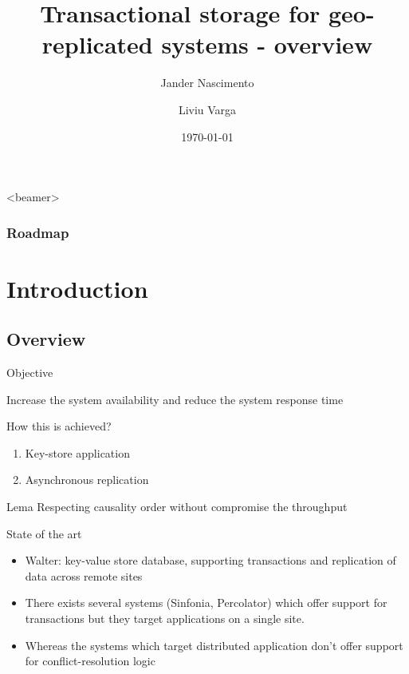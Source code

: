\documentclass{beamer}
\title[Transactional storage for geo-replicated systems ]{Transactional storage for geo-replicated systems - overview}
\author{Jander Nascimento
\and Liviu Varga}
\institute{Université Joseph Fourier}
\date{\today}
\begin{document}
\begin{frame}
\titlepage
\end{frame}

{
  \begin{frame}<beamer>
    \frametitle{Roadmap}
    \tableofcontents%
  \end{frame}
}


\section{Introduction}

	\subsection{Overview}
	
		\begin{frame}{Objective}
		
			Increase the system availability and reduce the system response time 
		
			How this is achieved?
			\begin{enumerate}
			\item Key-store application
			\item Asynchronous replication
			\end{enumerate}
			
			\begin{block}{Lema}
				Respecting causality order without compromise the throughput
			\end{block}		
		
		\end{frame}	
	
		\begin{frame}{State of the art}
		
		\begin{itemize}
		\item Walter: key-value store database, supporting transactions and replication of data across remote sites
		\item There exists several systems (Sinfonia, Percolator) which offer support for transactions but they target applications on a single site. 
		\item Whereas the systems which target distributed application don't offer support for conflict-resolution logic
		\end{itemize}
		
		\end{frame}	
		
\end{document}
